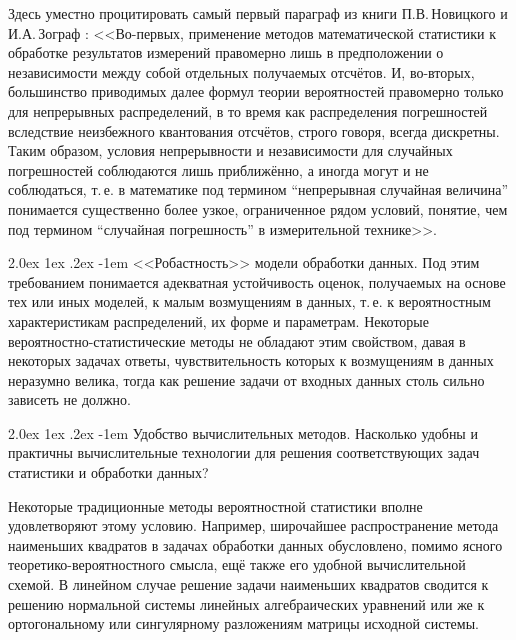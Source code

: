 \documentclass[a5paper,openany]{book}
\makeatletter
\renewcommand\paragraph{\@startsection{paragraph}{4}{\z@}%
                         {2.0ex \@plus1ex \@minus.2ex}%
                         {-1em}%
                         {\normalfont\normalsize\bfseries}}
\makeatother
\begin{document}
Здесь уместно процитировать самый первый параграф из книги П.В.\,Новицкого и 
И.А.\,Зограф \cite{NovitskiZograf}: <<Во-первых, применение методов математической 
статистики к обработке результатов измерений правомерно лишь в предположении 
о независимости между собой отдельных получаемых отсчётов. И, во-вторых, большинство 
приводимых далее формул теории вероятностей правомерно только для непрерывных 
распределений, в то время как распределения погрешностей вследствие неизбежного 
квантования отсчётов, строго говоря, всегда дискретны. Таким образом, условия 
непрерывности и независимости для случайных погрешностей соблюдаются лишь приближённо, 
а иногда могут и не соблюдаться, т.\,е. в математике под термином ``непрерывная 
случайная величина'' понимается существенно более узкое, ограниченное рядом условий, 
понятие, чем под термином ``случайная погрешность'' в измерительной технике>>. 
  
  
\paragraph{<<Робастность>> модели обработки данных.} 
Под этим требованием понимается адекватная устойчивость оценок, получаемых на основе тех 
или иных моделей, к малым возмущениям в данных, т.\,е. к  вероятностным характеристикам 
распределений, их форме и параметрам. Некоторые вероятностно-статистические методы 
не обладают этим свойством, давая в некоторых задачах ответы, чувствительность которых 
к возмущениям в данных неразумно велика, тогда как решение задачи от входных данных 
столь сильно зависеть не должно.                  
  
  
\paragraph{Удобство вычислительных методов.} Насколько удобны и практичны 
вычислительные технологии для решения соответствующих задач статистики и обработки 
данных? 
  
Некоторые традиционные методы вероятностной статистики вполне удовлетворяют этому 
условию. Например, широчайшее распространение метода наименьших квадратов в задачах 
обработки данных обусловлено, помимо ясного теоретико-вероятностного смысла, ещё 
также его удобной вычислительной схемой. В линейном случае решение задачи наименьших 
квадратов сводится к решению нормальной системы линейных алгебраических уравнений или 
же к ортогональному или сингулярному разложениям матрицы исходной системы. 
  
\end{document}
